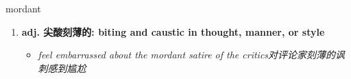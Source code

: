 
\begin{frame}
{\huge mordant}
\begin{center}
\begin{enumerate}\Large
  \item \textbf{adj. 尖酸刻薄的: biting and caustic in thought, manner, or style}
  \begin{itemize}
    \item \em{\Large{feel embarrassed about the mordant satire of the critics对评论家刻薄的讽刺感到尴尬}}
  \end{itemize}
\end{enumerate}
\end{center}
\end{frame}
